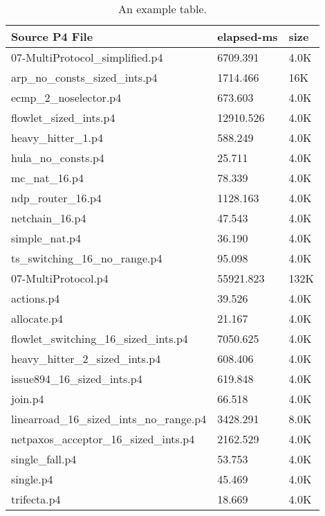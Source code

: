 \begin{table}
	\begin{center}
		\begin{tabular}{|l|l|l|}
			\hline
			Source P4 File & elapsed-ms & size \\
			\hline
			07-MultiProtocol_simplified.p4 & 6709.391 & 4.0K \\
			\hline
			arp_no_consts_sized_ints.p4 & 1714.466 & 16K \\
			\hline
			ecmp_2_noselector.p4 & 673.603 & 4.0K \\
			\hline
			flowlet_sized_ints.p4 & 12910.526 & 4.0K \\
			\hline
			heavy_hitter_1.p4 & 588.249 & 4.0K \\
			\hline
			hula_no_consts.p4 & 25.711 & 4.0K \\
			\hline
			mc_nat_16.p4 & 78.339 & 4.0K \\
			\hline
			ndp_router_16.p4 & 1128.163 & 4.0K \\
			\hline
			netchain_16.p4 & 47.543 & 4.0K \\
			\hline
			simple_nat.p4 & 36.190 & 4.0K \\
			\hline
			ts_switching_16_no_range.p4 & 95.098 & 4.0K \\
			\hline
			07-MultiProtocol.p4 & 55921.823 & 132K \\
			\hline
			actions.p4 & 39.526 & 4.0K \\
			\hline
			allocate.p4 & 21.167 & 4.0K \\
			\hline
			flowlet_switching_16_sized_ints.p4 & 7050.625 & 4.0K \\
			\hline
			heavy_hitter_2_sized_ints.p4 & 608.406 & 4.0K \\
			\hline
			issue894_16_sized_ints.p4 & 619.848 & 4.0K \\
			\hline
			join.p4 & 66.518 & 4.0K \\
			\hline
			linearroad_16_sized_ints_no_range.p4 & 3428.291 & 8.0K \\
			\hline
			netpaxos_acceptor_16_sized_ints.p4 & 2162.529 & 4.0K \\
			\hline
			single_fall.p4 & 53.753 & 4.0K \\
			\hline
			single.p4 & 45.469 & 4.0K \\
			\hline
			trifecta.p4 & 18.669 & 4.0K \\
			\hline
		\end{tabular}
	\end{center}
	\caption{An example table.}
	\label{table:example_table}
\end{table}